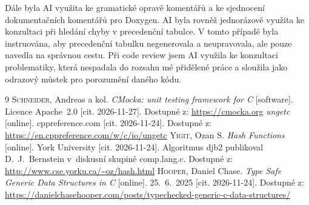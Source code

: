 \documentclass[a4paper,11pt]{article}
\begin{document}
Dále byla AI využita ke gramatické opravě komentářů a ke sjednocení dokumentačních komentářů pro Doxygen. AI byla rovněž jednorázově využita ke konzultaci při hledání chyby v precedenční tabulce. V tomto případě byla instruována, aby precedenční tabulku negenerovala a neupravovala, ale pouze navedla na správnou cestu. Při code review jsem AI využila ke konzultaci problematiky, která nespadala do rozsahu mé přidělené práce a sloužila jako odrazový můstek pro porozumění daného kódu.
\begin{thebibliography}{9}
        \textsc{Schneider}, Andreas a kol. \emph{CMocka: unit testing framework for C} [software]. Licence Apache~2.0 [cit. 2026-11-27]. Dostupné z: \url{https://cmocka.org}
        \emph{ungetc} [online]. cppreference.com [cit. 2026-11-24]. Dostupné z: \url{https://en.cppreference.com/w/c/io/ungetc}
        \textsc{Yigit}, Ozan S. \emph{Hash Functions} [online]. York University [cit. 2026-11-24]. Algoritmus djb2 publikoval D.~J.~Bernstein v~diskusní skupině comp.lang.c. Dostupné z: \url{http://www.cse.yorku.ca/~oz/hash.html}
        \textsc{Hooper}, Daniel Chase. \emph{Type Safe Generic Data Structures in C} [online]. 25.~6.~2025 [cit. 2026-11-24]. Dostupné z: \url{https://danielchasehooper.com/posts/typechecked-generic-c-data-structures/}
\end{thebibliography}
 
\end{document}
